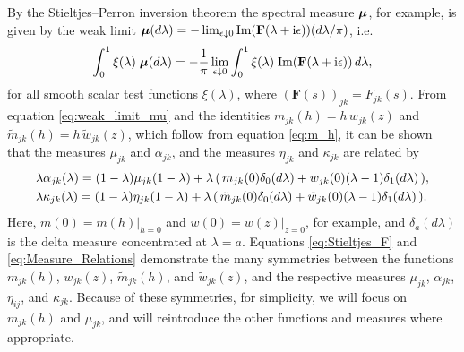 \documentclass{cmslatex}
\newcommand{\I}{\mathrm{i}}
\newcommand\bmu{\mbox{\boldmath${\mu}$}}
\begin{document}
By the Stieltjes--Perron inversion theorem 
\cite{Henrici:1974:v2,MILTON:2002:TC} the spectral measure $\bmu$, 
for example, is given by the weak limit 
$\bmu(d\lambda)=-\lim_{\epsilon\downarrow0}\text{Im}(\mathbf{F}(\lambda+\I\epsilon))(d\lambda/\pi)$, i.e.
%
\begin{align}\label{eq:weak_limit_mu}
  \int_0^1\xi(\lambda)\;\bmu(d\lambda)
  =-\frac{1}{\pi}\lim_{\epsilon\downarrow0}
        \int_0^1\xi(\lambda)\;\text{Im}(\mathbf{F}(\lambda+\I\epsilon))\, d\lambda,
\end{align}
%
for all smooth scalar test functions $\xi(\lambda)$, where
$(\mathbf{F}(s))_{jk}=F_{jk}(s)$. From equation
\eqref{eq:weak_limit_mu} and the identities 
$m_{jk}(h)=h\,w_{jk}(z)$ and $\tilde{m}_{jk}(h)=h\,\tilde{w}_{jk}(z)$,
which follow from equation \eqref{eq:m_h}, it can be
shown \cite{Murphy:JMP:063506} that the measures $\mu_{jk}$ and
$\alpha_{jk}$, and the measures $\eta_{jk}$ and $\kappa_{jk}$ are related by  
%
\begin{align}\label{eq:Measure_Relations}
  &\lambda\alpha_{jk}(\lambda)=(1-\lambda)\mu_{jk}(1-\lambda) +
       \lambda\,(\,m_{jk}(0)\delta_0(d\lambda)+w_{jk}(0)(\lambda-1)\delta_1(d\lambda)\,),
  \\
  &\lambda\kappa_{jk}(\lambda)=(1-\lambda)\eta_{jk}(1-\lambda) +
       \lambda\,(\,\tilde{m}_{jk}(0)\delta_0(d\lambda)+\tilde{w}_{jk}(0)(\lambda-1)\delta_1(d\lambda)\,).
  \notag     
\end{align}
%
Here, $m(0)=m(h)|_{h=0}$ and $w(0)=w(z)|_{z=0}$, for example, and
$\delta_a(d\lambda)$ is the delta measure concentrated at $\lambda=a$. Equations 
\eqref{eq:Stieltjes_F} and \eqref{eq:Measure_Relations} demonstrate
the many symmetries between the functions $m_{jk}(h)$, $w_{jk}(z)$,
$\tilde{m}_{jk}(h)$, and $\tilde{w}_{jk}(z)$, and the respective 
measures $\mu_{jk}$, $\alpha_{jk}$, $\eta_{ij}$, and $\kappa_{jk}$. Because of these
symmetries, for simplicity, we will focus on $m_{jk}(h)$ and $\mu_{jk}$,
and will reintroduce the other functions and measures where
appropriate.  
\end{document}

